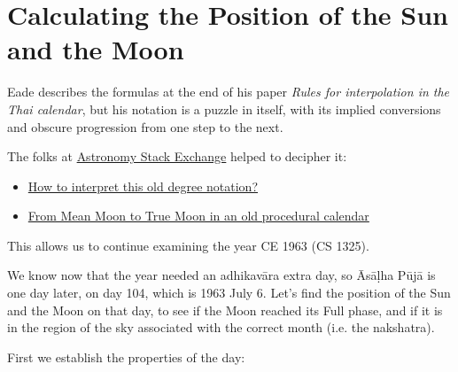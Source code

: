 \documentclass[11pt,oneside]{memoir-article}
\begin{document}
\label{adhikavara-years-end}

\section{Calculating the Position of the Sun and the Moon}
\label{sec-5-5}
\label{calculating-the-sun-and-moon}

Eade describes the formulas at the end of his paper \emph{Rules for interpolation in
the Thai calendar}\autocite{eade2000rules}, but his notation is a puzzle in itself,
with its implied conversions and obscure progression from one step to the next.

The folks at \href{http://astronomy.stackexchange.com/}{Astronomy Stack Exchange} helped to decipher it:

\begin{itemize}
\item \href{http://astronomy.stackexchange.com/questions/11753/how-to-interpret-this-old-degree-notation}{How to interpret this old degree notation?}
\item \href{http://astronomy.stackexchange.com/questions/12052/from-mean-moon-to-true-moon-in-an-old-procedural-calendar}{From Mean Moon to True Moon in an old procedural calendar}
\end{itemize}

This allows us to continue examining the year CE 1963 (CS 1325).

We know now that the year needed an adhikavāra extra day, so Āsāḷha Pūjā is one
day later, on day 104, which is 1963 July 6. Let's find the position of the Sun
and the Moon on that day, to see if the Moon reached its Full phase, and if it
is in the region of the sky associated with the correct month (i.e. the
nakshatra).

First we establish the properties of the day:
\end{document}
